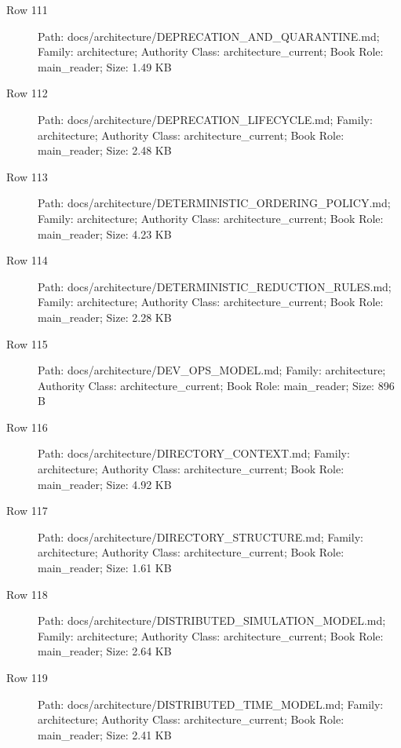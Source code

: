 \documentclass[9pt,a4paper]{book}
\begin{document}
\begin{description}
\item[Row 111] Path: docs/\allowbreak{}architecture/\allowbreak{}DEPRECATION\_\allowbreak{}AND\_\allowbreak{}QUARANTINE.\allowbreak{}md; Family: architecture; Authority Class: architecture\_\allowbreak{}current; Book Role: main\_\allowbreak{}reader; Size: 1.\allowbreak{}49 KB
\item[Row 112] Path: docs/\allowbreak{}architecture/\allowbreak{}DEPRECATION\_\allowbreak{}LIFECYCLE.\allowbreak{}md; Family: architecture; Authority Class: architecture\_\allowbreak{}current; Book Role: main\_\allowbreak{}reader; Size: 2.\allowbreak{}48 KB
\item[Row 113] Path: docs/\allowbreak{}architecture/\allowbreak{}DETERMINISTIC\_\allowbreak{}ORDERING\_\allowbreak{}POLICY.\allowbreak{}md; Family: architecture; Authority Class: architecture\_\allowbreak{}current; Book Role: main\_\allowbreak{}reader; Size: 4.\allowbreak{}23 KB
\item[Row 114] Path: docs/\allowbreak{}architecture/\allowbreak{}DETERMINISTIC\_\allowbreak{}REDUCTION\_\allowbreak{}RULES.\allowbreak{}md; Family: architecture; Authority Class: architecture\_\allowbreak{}current; Book Role: main\_\allowbreak{}reader; Size: 2.\allowbreak{}28 KB
\item[Row 115] Path: docs/\allowbreak{}architecture/\allowbreak{}DEV\_\allowbreak{}OPS\_\allowbreak{}MODEL.\allowbreak{}md; Family: architecture; Authority Class: architecture\_\allowbreak{}current; Book Role: main\_\allowbreak{}reader; Size: 896 B
\item[Row 116] Path: docs/\allowbreak{}architecture/\allowbreak{}DIRECTORY\_\allowbreak{}CONTEXT.\allowbreak{}md; Family: architecture; Authority Class: architecture\_\allowbreak{}current; Book Role: main\_\allowbreak{}reader; Size: 4.\allowbreak{}92 KB
\item[Row 117] Path: docs/\allowbreak{}architecture/\allowbreak{}DIRECTORY\_\allowbreak{}STRUCTURE.\allowbreak{}md; Family: architecture; Authority Class: architecture\_\allowbreak{}current; Book Role: main\_\allowbreak{}reader; Size: 1.\allowbreak{}61 KB
\item[Row 118] Path: docs/\allowbreak{}architecture/\allowbreak{}DISTRIBUTED\_\allowbreak{}SIMULATION\_\allowbreak{}MODEL.\allowbreak{}md; Family: architecture; Authority Class: architecture\_\allowbreak{}current; Book Role: main\_\allowbreak{}reader; Size: 2.\allowbreak{}64 KB
\item[Row 119] Path: docs/\allowbreak{}architecture/\allowbreak{}DISTRIBUTED\_\allowbreak{}TIME\_\allowbreak{}MODEL.\allowbreak{}md; Family: architecture; Authority Class: architecture\_\allowbreak{}current; Book Role: main\_\allowbreak{}reader; Size: 2.\allowbreak{}41 KB

\end{description}
\end{document}
